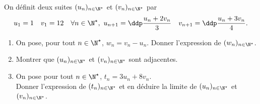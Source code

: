 
\begin{exercice} \;
On d\'efinit deux suites $(u_n)_{n\in\N^{\star}}$ et $(v_n)_{n\in\N^{\star}}$ par 
$$u_1=1\quad v_1=12\quad \forall n\in\N^{\star},\ u_{n+1}=\ddp\frac{u_n+2v_n}{3}\quad v_{n+1}=\ddp\frac{u_n+3v_n}{4}.$$
\begin{enumerate}
 \item
On pose, pour tout $n\in\N^{\star}$, $w_n=v_n-u_n$. Donner l'expression de $(w_n)_{n\in\N^{\star}}$. 
\item 
Montrer que $(u_n)_{n\in\N^{\star}}$ et $(v_n)_{n\in\N^{\star}}$ sont adjacentes.
\item 
On pose pour tout $n\in\N^{\star}$, $t_n=3u_n+8v_n$. \\
Donner l'expression de $(t_n)_{n\in\N^{\star}}$ et en d\'eduire la limite de $(u_n)_{n\in\N^{\star}}$ et $(v_n)_{n\in\N^{\star}}$.
\end{enumerate}
\end{exercice}